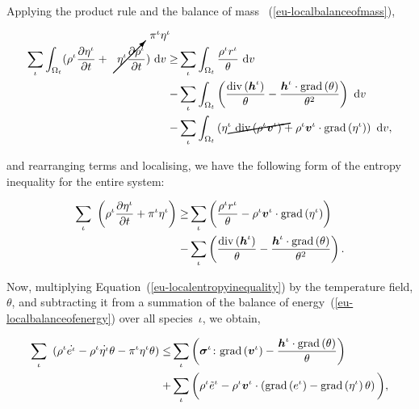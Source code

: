 \noindent Applying the product rule and the balance of mass%
~(\ref{eu-localbalanceofmass}),

\begin{equation*}
\begin{split}
\sum\limits_{\iota} \int_{\Omega_{t}} ( \rho^{\iota} \frac{\partial
  \eta^{\iota}}{\partial t} +
\cancelto{\pi^{\iota}\eta^{\iota}}{\eta^{\iota} \frac{\partial
    \rho^{\iota}}{\partial t}}) \ \mathrm{d}v \geq &
\sum\limits_{\iota} \int_{\Omega_{t}} \frac{ \rho^{\iota}
  r^{\iota}}{\theta}\ \mathrm{d}v\\ -& \sum\limits_{\iota}
\int_{\Omega_{t}} \left(
\frac{\mathrm{div}\left(\bh^{\iota}\right)}{\theta} -
\frac{\bh^{\iota}\cdot\mathrm{grad}\left(\theta\right)}{\theta^{2}}
\right)\ \mathrm{d}v \\ - & \sum\limits_{\iota} \int_{\Omega_{t}}
\left( \cancel{\eta^{\iota}\ \mathrm{div}
  \left(\rho^{\iota}\bv^{\iota} \right)} +
\rho^{\iota}\bv^{\iota}\cdot\mathrm{grad}\left(\eta^{\iota}\right)
\right)\ \mathrm{d}v,
\end{split}
\end{equation*}

\noindent and rearranging terms and localising, we have the following
form of the entropy inequality for the entire system:

\begin{equation}
\begin{split}
\sum\limits_{\iota}\ \left( \rho^{\iota} \frac{\partial
  \eta^{\iota}}{\partial t} + \pi^{\iota}\eta^{\iota}\right) \geq &
\sum\limits_{\iota} \left( \frac{ \rho^{\iota} r^{\iota}}{\theta} -
\rho^{\iota}\mbox{\boldmath$ v$}^{\iota}\cdot\mathrm{grad}\left(\eta^{\iota}
\right)\right)\ \\ -& \sum\limits_{\iota} \left(
\frac{\mathrm{div}\left(\mbox{\boldmath$ h$}^{\iota}\right)}{\theta} -
\frac{\mbox{\boldmath$ h$}^{\iota}\cdot\mathrm{grad}\left(\theta\right)}{\theta^{2}}
\right).
\end{split}
\label{eu-localentropyinequality}
\end{equation}

Now, multiplying Equation~(\ref{eu-localentropyinequality}) by the
temperature field, $\theta$, and subtracting it from a summation of the
balance of energy~(\ref{eu-localbalanceofenergy}) over all
species~$\iota$, we obtain,

\begin{equation*}
\begin{split}
\sum\limits_{\iota}\ \left(\rho^{\iota} \dot{e^{\iota}} -
\rho^{\iota} \dot{\eta^{\iota}} \theta 
 - \pi^{\iota}\eta^{\iota}\theta \right) \leq &
\sum\limits_{\iota} \left(
\mbox{\boldmath$\sigma$}^{\iota}\colon\mathrm{grad}\left(\mbox{\boldmath$ v$}^{\iota}\right)
- \frac{\mbox{\boldmath$ h$}^{\iota}\cdot\mathrm{grad}\left(\theta\right)}{\theta}
\right)\ \\ +& \sum\limits_{\iota}\bigg( \rho^{\iota} \tilde{e}^{\iota} -
\rho^{\iota}\mbox{\boldmath$ v$}^{\iota} \cdot\left(
\mathrm{grad} \left(e^{\iota}\right) - \mathrm{grad}\left(\eta^{\iota}
\right)\theta\right)\bigg),
\end{split}
\end{equation*}

